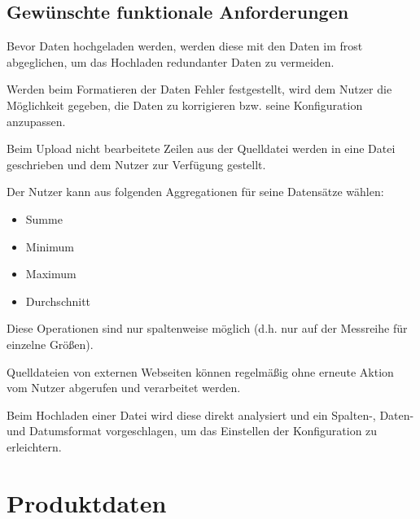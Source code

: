 \documentclass[a4paper, 12 pt]{article}
\begin{document}
	\subsection{Gewünschte funktionale Anforderungen}
	
	
	
	
	Bevor Daten hochgeladen werden, werden diese mit den Daten im \gls{frost} abgeglichen, um das Hochladen redundanter Daten zu vermeiden.
	
	Werden beim Formatieren der Daten Fehler festgestellt, wird dem Nutzer die Möglichkeit gegeben, die Daten zu korrigieren bzw. seine Konfiguration anzupassen.	
	
	Beim Upload nicht bearbeitete Zeilen aus der Quelldatei werden in eine Datei geschrieben und dem Nutzer zur Verfügung gestellt.
	
	Der Nutzer kann aus folgenden Aggregationen für seine Datensätze wählen:
	\begin{itemize}
			\item Summe
			\item Minimum
			\item Maximum
			\item Durchschnitt
	\end{itemize}
	Diese Operationen sind nur spaltenweise möglich (d.h. nur auf der Messreihe für einzelne Größen).
	
	Quelldateien von externen Webseiten können regelmäßig ohne erneute Aktion vom Nutzer abgerufen und verarbeitet werden.
	
	Beim Hochladen einer Datei wird diese direkt analysiert und ein Spalten-, Daten- und Datumsformat vorgeschlagen, um das Einstellen der Konfiguration zu erleichtern.
	
	
	
	
	
	\section{Produktdaten}
	
\end{document}

